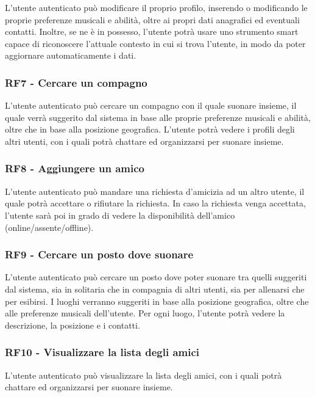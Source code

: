 \documentclass[12pt, a4paper]{article}
\begin{document}
L'utente autenticato può modificare il proprio profilo, inserendo o modificando le proprie preferenze musicali e abilità, oltre ai propri dati anagrafici ed eventuali contatti. Inoltre, se ne è in possesso, l'utente potrà usare uno strumento smart capace di riconoscere l'attuale contesto in cui si trova l'utente, in modo da poter aggiornare automaticamente i dati.

\subsubsection{RF7 - Cercare un compagno}

L'utente autenticato può cercare un compagno con il quale suonare insieme, il quale verrà suggerito dal sistema in base alle proprie preferenze musicali e abilità, oltre che in base alla posizione geografica. L'utente potrà vedere i profili degli altri utenti, con i quali potrà chattare ed organizzarsi per suonare insieme.

\subsubsection{RF8 - Aggiungere un amico}

L'utente autenticato può mandare una richiesta d'amicizia ad un altro utente, il quale potrà accettare o rifiutare la richiesta. In caso la richiesta venga accettata, l'utente sarà poi in grado di vedere la disponibilità dell'amico (online/assente/offline).

\subsubsection{RF9 - Cercare un posto dove suonare}

L'utente autenticato può cercare un posto dove poter suonare tra quelli suggeriti dal sistema, sia in solitaria che in compagnia di altri utenti, sia per allenarsi che per esibirsi. I luoghi verranno suggeriti in base alla posizione geografica, oltre che alle preferenze musicali dell'utente. Per ogni luogo, l'utente potrà vedere la descrizione, la posizione e i contatti.

\subsubsection{RF10 - Visualizzare la lista degli amici}

L'utente autenticato può visualizzare la lista degli amici, con i quali potrà chattare ed organizzarsi per suonare insieme.
\end{document}
